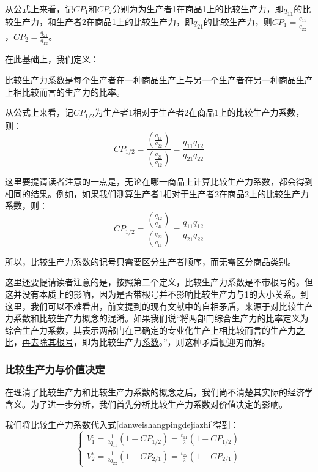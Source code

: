 从公式上来看，记$ \mathit{CP}_1 $和$ \mathit{CP}_2 $分别为为生产者1在商品1上的比较生产力，即$q_{11}$的比较生产力，和生产者2在商品1上的比较生产力，即$q_{21}$的比较生产力，则$ \mathit{CP}_1 = \frac{q_{11}}{q_{22}} $，$ \mathit{CP}_2 = \frac{q_{21}}{q_{12}} $。

在此基础上，我们定义：
\begin{definition}
    比较生产力系数是每个生产者在一种商品生产上与另一个生产者在另一种商品生产上相比较而言的生产力的比率。
\end{definition}


从公式上来看，记$\mathit{CP_{1/2}}$为生产者1相对于生产者2在商品1上的比较生产力系数，则：
\begin{equation}
    \mathit{CP}_{1/2} = \frac{\left(\frac{q_{11}}{q_{22}}\right)}{\left(\frac{q_{21}}{q_{12}}\right)} = \frac{q_{11}q_{12}}{q_{21}q_{22}}
\end{equation}

这里要提请读者注意的一点是，无论在哪一商品上计算比较生产力系数，都会得到相同的结果。例如，如果我们测算生产者1相对于生产者2在商品2上的比较生产力系数，则：
\begin{equation}
    \mathit{CP}_{1/2} = \frac{\left(\frac{q_{12}}{q_{21}}\right)}{\left(\frac{q_{22}}{q_{11}}\right)} = \frac{q_{11}q_{12}}{q_{21}q_{22}}
\end{equation}

所以，比较生产力系数的记号只需要区分生产者顺序，而无需区分商品类别。

这里还要提请读者注意的是，按照第二个定义，比较生产力系数是不带根号的。但这并没有本质上的影响，因为是否带根号并不影响比较生产力与1的大小关系。到这里，我们可以不难看出，前文提到的现有文献中的自相矛盾，来源于对比较生产力系数和比较生产力概念的混淆。如果我们说“将两部门综合生产力的比率定义为综合生产力系数，其表示两部门在已确定的专业化生产上相比较而言的生产力\underline{之比}，\underline{再去除其根号}，即为比较生产力\underline{系数}。”，则这种矛盾便迎刃而解。

\subsubsection{比较生产力与价值决定}

在理清了比较生产力和比较生产力系数的概念之后，我们尚不清楚其实际的经济学含义。为了进一步分析，我们首先分析比较生产力系数对价值决定的影响。

我们将比较生产力系数代入式\ref{danweishangpingdejiazhi}得到：
\begin{equation}
    \begin{cases}
        V_1^c = \frac{1}{2q_{11}} \left( 1 + \mathit{CP}_{1/2} \right) = \frac{t_{11}}{2} \left( 1 + \mathit{CP}_{1/2} \right) \\
        V_2^c = \frac{1}{2q_{22}} \left( 1 + \mathit{CP}_{2/1} \right) = \frac{t_{22}}{2} \left( 1 + \mathit{CP}_{2/1} \right)
    \end{cases}
\end{equation}

